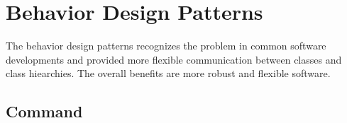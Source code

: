 \section{Behavior Design Patterns}

\iftwocolumns
\begin{multicols}{2}
\fi

The behavior design patterns recognizes the problem in common software developments and provided more flexible communication between classes and class hiearchies. The overall benefits are more robust and flexible software.

\subsection{Command}\label{ssection:command}


\end{multicols}
